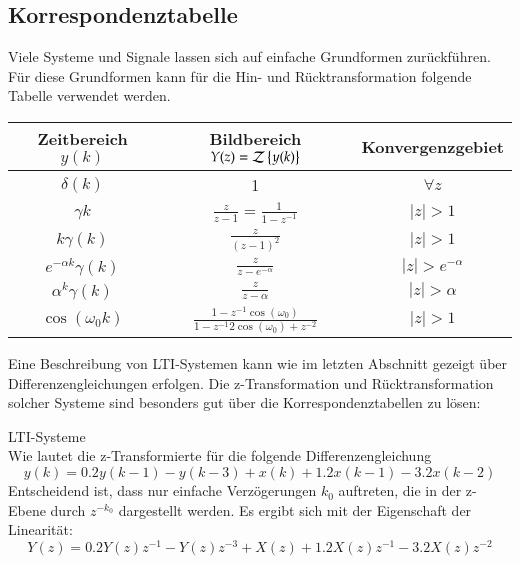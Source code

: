 \subsection{Korrespondenztabelle}

Viele Systeme und Signale lassen sich auf einfache Grundformen
zurückführen. Für diese Grundformen kann für die Hin- und
Rücktransformation folgende Tabelle verwendet werden.

\begin{tabular}{|c|c|c|}
  \hline
  Zeitbereich $y(k)$ & Bildbereich $Y(z) = {\cal Z}\left\{y(k)\right\}$ & Konvergenzgebiet \\
  \hline
  $\delta(k)$     & 1                                 & $\forall z$\\
  $\gamma{k}$     & $\frac{z}{z-1} = \frac{1}{1-z^{-1}} $ & $|z|>1$ \\
  $k \gamma(k)$   & $\frac{z}{(z-1)^2}$               & $|z|>1$\\
  $e^{-\alpha k}\gamma (k)$ & $\frac{z}{z-e^{-\alpha}}$  & $|z|>e^{-\alpha}$\\
  $\alpha^k \gamma (k)$ & $\frac{z}{z-\alpha}$ & $|z| > \alpha$ \\
  $\cos(\omega_0 k)$ & $\frac{1-z^{-1} \cos(\omega_0)}{1-z^{-1} 2\cos(\omega_0)+z^{-2}}$ & $|z|>1$\\
  \hline
\end{tabular}

Eine Beschreibung von LTI-Systemen kann wie im letzten Abschnitt gezeigt
über Differenzengleichungen erfolgen.
Die z-Transformation und Rücktransformation solcher Systeme sind besonders
gut über die Korrespondenztabellen zu lösen:
\hspace*{1cm}

\begin{example}
LTI-Systeme\\
Wie lautet die z-Transformierte für die folgende Differenzengleichung
\[
    y(k) = 0.2y(k-1) - y(k-3) + x(k) + 1.2x(k-1) - 3.2 x(k-2)
\]
Entscheidend ist, dass nur einfache Verzögerungen $k_0$ auftreten, die in der z-Ebene
durch $z^{-k_0}$ dargestellt werden.
Es ergibt sich mit der Eigenschaft der Linearität:
\[
    Y(z) = 0.2Y(z) z^{-1} - Y(z) z^{-3} + X(z) + 1.2X(z) z^{-1} - 3.2X(z) z^{-2}
\]
\end{example}

